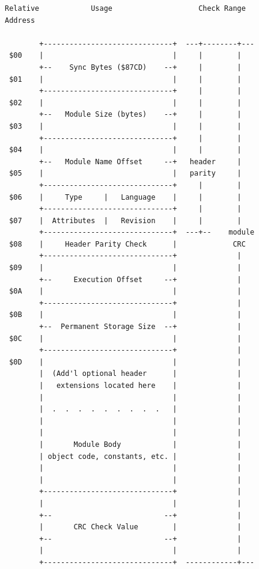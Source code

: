 \documentclass[
]{article}
\begin{document}
\begin{figure}
\centering
\begin{verbatim}
Relative            Usage                    Check Range
Address

        +------------------------------+  ---+--------+---
 $00    |                              |     |        |
        +--    Sync Bytes ($87CD)    --+     |        |
 $01    |                              |     |        |
        +------------------------------+     |        |
 $02    |                              |     |        |
        +--   Module Size (bytes)    --+     |        |
 $03    |                              |     |        |
        +------------------------------+     |        |
 $04    |                              |     |        |
        +--   Module Name Offset     --+   header     |
 $05    |                              |   parity     |
        +------------------------------+     |        |
 $06    |     Type     |   Language    |     |        |
        +------------------------------+     |        |
 $07    |  Attributes  |   Revision    |     |        |
        +------------------------------+  ---+--    module
 $08    |     Header Parity Check      |             CRC
        +------------------------------+              |
 $09    |                              |              |
        +--     Execution Offset     --+              |
 $0A    |                              |              |
        +------------------------------+              |
 $0B    |                              |              |
        +--  Permanent Storage Size  --+              |
 $0C    |                              |              |
        +------------------------------+              |
 $0D    |                              |              |
        |  (Add'l optional header      |              |
        |   extensions located here    |              |
        |                              |              |
        |  .  .  .  .  .  .  .  .  .   |              |
        |                              |              |
        |                              |              |
        |       Module Body            |              |
        | object code, constants, etc. |              |
        |                              |              |
        |                              |              |
        +------------------------------+              |
        |                              |              |
        +--                          --+              |
        |       CRC Check Value        |              |
        +--                          --+              |
        |                              |              |
        +------------------------------+  ------------+---
\end{verbatim}
\caption{}
\end{figure}
\end{document}
